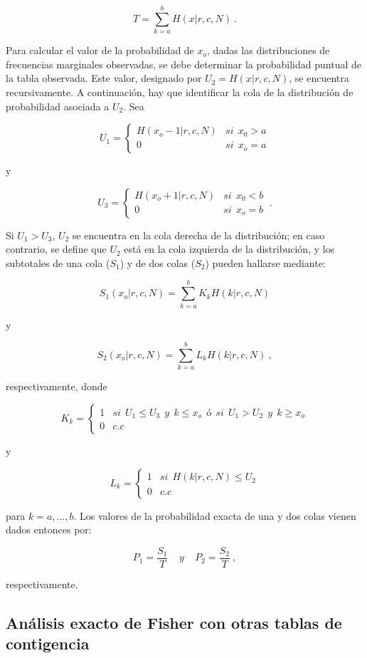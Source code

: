 \documentclass[12pt,a4paper,]{book}
\numberwithin{dummy}{section}
\theoremstyle{ocrenumbox}
\theoremstyle{blacknumex}
\theoremstyle{blacknumbox}
\theoremstyle{ocrenum}
\theoremstyle{ocrenum}
\begin{document}
\[
T=\sum_{k=a}^bH(x|r, c,N)~.
\]

Para calcular el valor de la probabilidad de \(x_o\), dadas las
distribuciones de frecuencias marginales observadas, se debe determinar
la probabilidad puntual de la tabla observada. Este valor, designado por
\(U_2 = H(x|r, c,N)\), se encuentra recursivamente. A continuación, hay
que identificar la cola de la distribución de probabilidad asociada a
\(U_2\). Sea

\[
U_1=\begin{cases}H(x_o-1|r,c,N) & si~~x_0 >a \\0 & si~~x_o = a\end{cases}
\]

y

\[
U_3=\begin{cases}H(x_o+1|r,c,N) & si~~x_0 <b \\0 & si~~x_o = b\end{cases}~.
\]

Si \(U_1 > U_3\), \(U_2\) se encuentra en la cola derecha de la
distribución; en caso contrario, se define que \(U_2\) está en la cola
izquierda de la distribución, y los subtotales de una cola (\(S_1\)) y
de dos colas (\(S_2\)) pueden hallarse mediante:

\[
S_1(x_o|r,c,N)=\sum_{k=a}^bK_kH(k|r,c,N)
\]

y

\[
S_2(x_o|r,c,N)=\sum_{k=a}^bL_kH(k|r,c,N)~,
\]

respectivamente, donde

\[
K_k=\begin{cases}1 & si~~U_1 \le U_3 ~~y~~k\le x_o~~ó~~si~~U_1>U_2~~y~~ k\ge x_o \\0 & c.c\end{cases}
\]

y

\[
L_k=\begin{cases}1 & si~~H(k|r,c,N)\le U_2 \\0 & c.c\end{cases}
\]

para \(k = a, . . . , b\). Los valores de la probabilidad exacta de una
y dos colas vienen dados entonces por:

\[
P_1=\frac{S_1}{T}~~~~~y~~~~~P_2=\frac{S_2}{T}~,
\]

respectivamente.

\hypertarget{anuxe1lisis-exacto-de-fisher-con-otras-tablas-de-contigencia}{%
\subsection{Análisis exacto de Fisher con otras tablas de
contigencia}\label{anuxe1lisis-exacto-de-fisher-con-otras-tablas-de-contigencia}}
\end{document}
